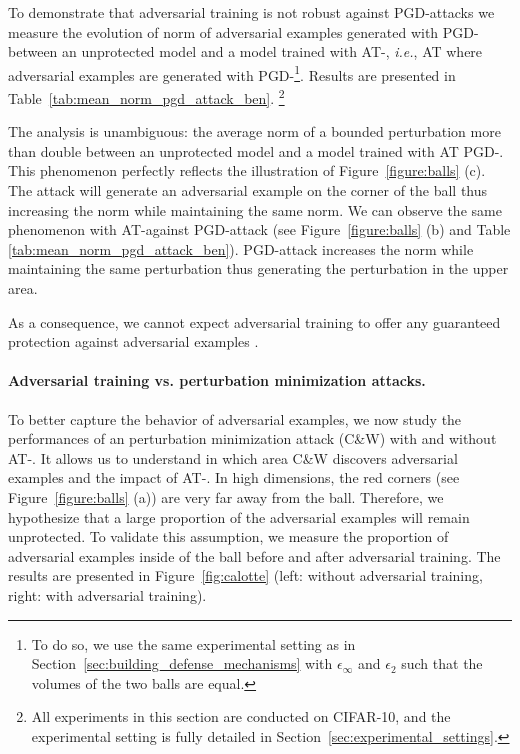 To demonstrate that \linf adversarial training is not robust against PGD-\ltwo attacks we measure the evolution of \ltwo norm of adversarial examples generated with PGD-\linf between an unprotected model and a model trained with AT-\linf, \emph{i.e.}, AT where adversarial examples are generated with PGD-\linf \footnote{To do so, we use the same experimental setting as in Section~\ref{sec:building_defense_mechanisms} with $\epsilon_\infty$ and $\epsilon_2$ such that the volumes of the two balls are equal.}. 
Results are presented in  Table~\ref{tab:mean_norm_pgd_attack_ben}. \footnote{All experiments in this section are conducted on CIFAR-10, and the experimental setting is fully detailed in Section~\ref{sec:experimental_settings}. }

The analysis is unambiguous: the average \linf norm of a bounded \ltwo perturbation more than double between an unprotected model and a model trained with AT PGD-\linf. This phenomenon perfectly reflects the illustration of Figure~\ref{figure:balls} (c). The attack will generate an adversarial example on the corner of the \linf ball thus increasing the \linf norm while maintaining the same \ltwo norm. 
We can observe the same phenomenon with AT-\ltwo against PGD-\linf attack (see Figure~\ref{figure:balls} (b) and Table \ref{tab:mean_norm_pgd_attack_ben}). PGD-\linf attack increases the \ltwo norm while maintaining the same \linf perturbation thus generating the perturbation in the upper area. 

As a consequence, we cannot expect adversarial training \linf to offer any guaranteed protection against \ltwo adversarial examples .

\paragraph{Adversarial training vs. perturbation minimization attacks.}
To better capture the behavior of \ltwo adversarial examples, we now study the performances of an \ltwo perturbation minimization attack (C\&W) with and without AT-\linf. It allows us to understand in which area C\&W discovers adversarial examples and the impact of AT-\linf. In high dimensions, the red corners (see Figure~\ref{figure:balls} (a)) are very far away from the \ltwo ball. Therefore, we hypothesize that a large proportion of the \ltwo adversarial examples will remain unprotected. To validate this assumption, we measure the proportion of adversarial examples inside of the \ltwo ball before and after \linf adversarial training. The results are presented in Figure~\ref{fig:calotte} (left: without adversarial training, right: with adversarial training). 


